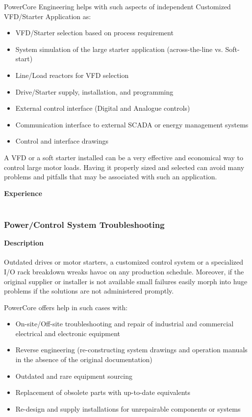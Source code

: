 PowerCore Engineering helps with such aspects of independent Customized VFD/Starter Application as: 
\begin{itemize}
	\item VFD/Starter selection based on process requirement
	\item System simulation of the large starter application (across-the-line vs. Soft-start)
	\item Line/Load reactors for VFD selection
	\item Drive/Starter supply, installation, and programming
	\item External control interface (Digital and Analogue controls)
	\item Communication interface to external SCADA or energy management systems
	\item Control and interface drawings
\end{itemize}

A VFD or a soft starter installed can be a very effective and economical way to control large motor loads. Having it properly sized and selected can avoid many problems and pitfalls that may be associated with such an application.

\textbf{Experience}\\
\\	
\subsubsection{Power/Control System Troubleshooting }
\label{Sub:Exp:SR}

\textbf{Description}\\
\\
Outdated drives or motor starters, a customized control system or a specialized I/O rack breakdown wreaks havoc on any production schedule. Moreover, if the original supplier or installer is not available small failures easily morph into huge problems if the solutions are not administered promptly. 

PowerCore offers help in such cases with: 
\begin{itemize}
	\item On-site/Off-site troubleshooting and repair of industrial and commercial electrical and electronic equipment
	\item Reverse engineering (re-constructing system drawings and operation manuals in the absence of the original documentation)
	\item Outdated and rare equipment sourcing
	\item Replacement of obsolete parts with up-to-date equivalents
	\item Re-design and supply installations for unrepairable components or systems
\end{itemize}

